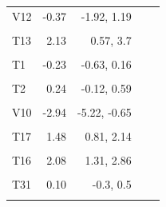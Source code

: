 \documentclass[
]{article}
\begin{document}
\begin{longtable}[t]{lrrrr}
\hspace{1em}V12 & -0.37 & -1.92, 1.19 &  & \\
\hspace{1em}\cellcolor{gray!6}{V1} & \cellcolor{gray!6}{-0.37} & \cellcolor{gray!6}{-0.53, -0.22} & \cellcolor{gray!6}{} & \cellcolor{gray!6}{}\\
\hspace{1em}T13 & 2.13 & 0.57, 3.7 &  & \\
\hspace{1em}\cellcolor{gray!6}{T41} & \cellcolor{gray!6}{-1.12} & \cellcolor{gray!6}{-1.44, -0.79} & \cellcolor{gray!6}{} & \cellcolor{gray!6}{}\\
\hspace{1em}T1 & -0.23 & -0.63, 0.16 &  & \\
\hspace{1em}\cellcolor{gray!6}{V2} & \cellcolor{gray!6}{-1.29} & \cellcolor{gray!6}{-1.77, -0.82} & \cellcolor{gray!6}{} & \cellcolor{gray!6}{}\\
\hspace{1em}T2 & 0.24 & -0.12, 0.59 &  & \\
\hspace{1em}\cellcolor{gray!6}{T40} & \cellcolor{gray!6}{0.19} & \cellcolor{gray!6}{-0.56, 0.94} & \cellcolor{gray!6}{} & \cellcolor{gray!6}{}\\
\hspace{1em}V10 & -2.94 & -5.22, -0.65 &  & \\
\hspace{1em}\cellcolor{gray!6}{T27} & \cellcolor{gray!6}{1.66} & \cellcolor{gray!6}{1, 2.32} & \cellcolor{gray!6}{} & \cellcolor{gray!6}{}\\
\hspace{1em}T17 & 1.48 & 0.81, 2.14 &  & \\
\hspace{1em}\cellcolor{gray!6}{T29} & \cellcolor{gray!6}{-4.86} & \cellcolor{gray!6}{-10.63, 0.9} & \cellcolor{gray!6}{} & \cellcolor{gray!6}{}\\
\hspace{1em}T16 & 2.08 & 1.31, 2.86 &  & \\
\hspace{1em}\cellcolor{gray!6}{V8} & \cellcolor{gray!6}{-3.14} & \cellcolor{gray!6}{-9.58, 3.31} & \cellcolor{gray!6}{} & \cellcolor{gray!6}{}\\
\hspace{1em}T31 & 0.10 & -0.3, 0.5 &  & \\
\hspace{1em}\cellcolor{gray!6}{V3} & \cellcolor{gray!6}{-0.67} & \cellcolor{gray!6}{-1.17, -0.18} & \cellcolor{gray!6}{} & \cellcolor{gray!6}{}\\

\end{longtable}
\end{document}
